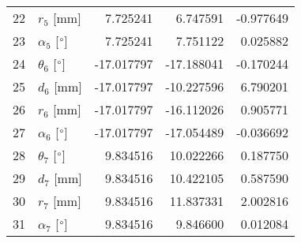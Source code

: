 \documentclass{standalone}%
\begin{document}
\begin{tabular}{llrrr}
22 &              $r_{5}$ [mm] &   7.725241 &   6.747591 &  -0.977649 \\
23 &  $\alpha_{5}$ [$\degree$] &   7.725241 &   7.751122 &   0.025882 \\
24 &  $\theta_{6}$ [$\degree$] & -17.017797 & -17.188041 &  -0.170244 \\
25 &              $d_{6}$ [mm] & -17.017797 & -10.227596 &   6.790201 \\
26 &              $r_{6}$ [mm] & -17.017797 & -16.112026 &   0.905771 \\
27 &  $\alpha_{6}$ [$\degree$] & -17.017797 & -17.054489 &  -0.036692 \\
28 &  $\theta_{7}$ [$\degree$] &   9.834516 &  10.022266 &   0.187750 \\
29 &              $d_{7}$ [mm] &   9.834516 &  10.422105 &   0.587590 \\
30 &              $r_{7}$ [mm] &   9.834516 &  11.837331 &   2.002816 \\
31 &  $\alpha_{7}$ [$\degree$] &   9.834516 &   9.846600 &   0.012084 \\
\bottomrule
\end{tabular}
%
\end{document}
